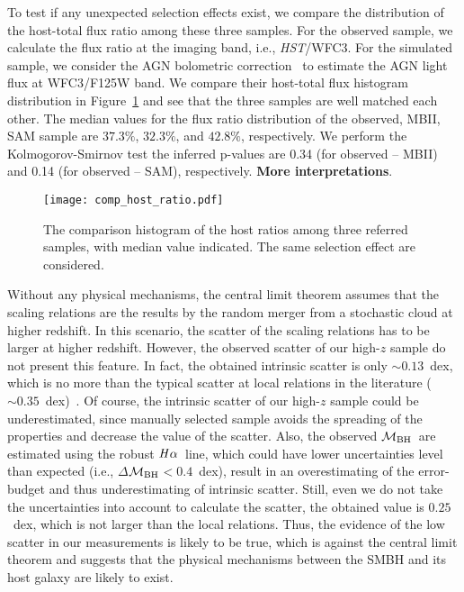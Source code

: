 \documentclass{natureprintstyle}
\newcommand{\hst}{{\it HST}}
\newcommand{\mbh}{$\mathcal M_{\rm BH}$}
\newcommand{\halpha}{${\it H}\alpha$}
\begin{document}
To test if any unexpected selection effects exist, we compare the distribution of the host-total flux ratio among these three samples. For the observed sample, we calculate the flux ratio at the imaging band, i.e., \hst/WFC3. For the simulated sample, we consider the AGN bolometric correction~\cite{Elvis1994} to estimate the AGN light flux at WFC3/F125W band. We compare their host-total flux histogram distribution in Figure~\ref{fig:comp_hist} and see that the three samples are well matched each other. The median values for the flux ratio distribution of the observed, MBII, SAM sample are $37.3\%$, $32.3\%$, and $42.8\%$, respectively. We perform the Kolmogorov-Smirnov test the inferred p-values are 0.34 (for observed -- MBII) and 0.14 (for observed -- SAM), respectively. {\bf More interpretations}.

\begin{figure}[t]
\texttt{[image: comp\_host\_ratio.pdf]}
\caption{The comparison histogram of the host ratios among three referred samples, with median value indicated. The same selection effect are considered.
}
\label{fig:comp_hist}
\end{figure}

Without any physical mechanisms, the central limit theorem assumes that the scaling relations are the results by the random merger from a stochastic cloud at higher redshift. In this scenario, the scatter of the scaling relations has to be larger at higher redshift. However, the observed scatter of our high-$z$ sample do not present this feature. In fact, the obtained intrinsic scatter is only $\sim0.13$~dex, which is no more than the typical scatter at local relations in the literature ($\sim0.35$~dex)~\cite{Kormendy13, Gul++09}. Of course, the intrinsic scatter of our high-$z$ sample could be underestimated, since manually selected sample avoids the spreading of the properties and decrease the value of the scatter. Also, the observed \mbh\ are estimated using the robust \halpha\ line, which could have lower uncertainties level than expected (i.e., $\Delta$\mbh$<0.4$~dex), result in an overestimating of the error-budget and thus underestimating of intrinsic scatter. Still, even we do not take the uncertainties into account to calculate the scatter, the obtained value is $0.25$~dex, which is not larger than the local relations. Thus, the evidence of the low scatter in our measurements is likely to be true, which is against the central limit theorem and suggests that the physical mechanisms between the SMBH and its host galaxy are likely to exist. 
\end{document}
